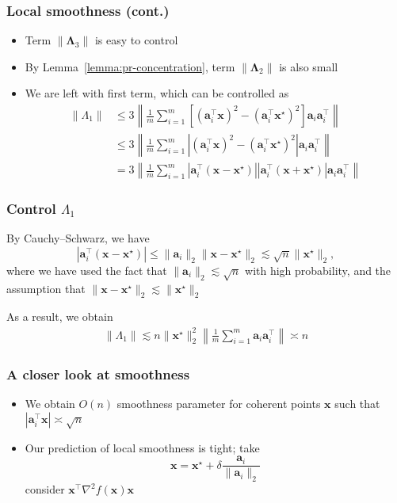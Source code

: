 \documentclass[compress,
mathserif,wide,%
]{beamer}
\begin{document}
\begin{frame}
	\frametitle{Local smoothness (cont.)}
	
	\begin{itemize}
		\item Term $\| \bm{\Lambda}_3 \|$ is easy to control
		\item By Lemma~\ref{lemma:pr-concentration}, term $\| \bm{\Lambda}_2 \|$ is also small
		\item We are left with first term, which can be controlled as
		\begin{align*}
			\| \Lambda_{1} \| &\leq 3 \left \| \frac{1}{m} \sum_{i=1}^{m}   [ (\bm{a}_i^\top \bm{x} )^2 - (\bm{a}_i^\top \bm{x}^\star )^2 ] \bm{a}_i \bm{a}_i^\top \right \| \\
			&\leq 3 \left \| \frac{1}{m} \sum_{i=1}^{m}   \left | (\bm{a}_i^\top \bm{x} )^2 - (\bm{a}_i^\top \bm{x}^\star )^2 \right |  \bm{a}_i \bm{a}_i^\top \right \| \\
			&= 3 \left \| \frac{1}{m} \sum_{i=1}^{m}   \left | \bm{a}_i^\top ( \bm{x} - \bm{x}^\star ) \right |  \left | \bm{a}_i^\top ( \bm{x} + \bm{x}^\star ) \right |  \bm{a}_i \bm{a}_i^\top \right \|
		\end{align*}
	\end{itemize}
\end{frame}

\begin{frame}
	\frametitle{Control $\Lambda_{1}$}
	By Cauchy--Schwarz, we have 
	\[
		\left | \bm{a}_i^\top ( \bm{x} - \bm{x}^\star ) \right | \leq \| \bm{a}_i \|_{2} \| \bm{x} - \bm{x}^\star \|_{2} \lesssim \sqrt{n} \| \bm{x}^\star \|_{2},
	\]
	where we have used the fact that $\| \bm{a}_i \|_2 \lesssim \sqrt{n}$ with high probability, and the assumption that $\|\bm{x} - \bm{x}^\star\|_2 \lesssim \|\bm{x}^\star\|_2$
	
	\vfill
	As a result, we obtain
	\begin{align*}
		\| \Lambda_{1} \| \lesssim n \|\bm{x}^\star\|_2^2  \left \| \frac{1}{m} \sum_{i=1}^{m} \bm{a}_{i} \bm{a}_{i}^\top \right \| \asymp n
	\end{align*}
	
	
\end{frame}



\begin{frame}
	\frametitle{A closer look at smoothness}
	
	\begin{itemize}
		\item We obtain $O(n)$ smoothness parameter for coherent points $\bm{x}$ such that $|\bm{a}_i^\top \bm{x}| \asymp \sqrt{n}$
		\item Our prediction of local smoothness is tight; take 
		\[
		\bm{x} = \bm{x}^\star + \delta \frac{ \bm{a}_i }{ \| \bm{a}_i \|_2 }
		\]
		consider $\bm{x}^\top \nabla^2 f( \bm{x} ) \bm{x}$
	\end{itemize}
\end{frame}
\end{document}
